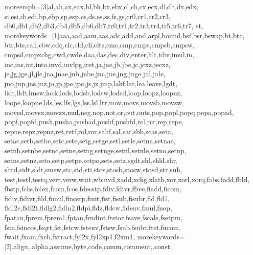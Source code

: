 


%
  {moreemph=[3]{al,ah,ax,eax,bl,bh,bx,ebx,cl,ch,cx,ecx,dl,dh,dx,edx,%
      si,esi,di,edi,bp,ebp,sp,esp,cs,ds,es,ss,fs,gs,cr0,cr1,cr2,cr3,%
      db0,db1,db2,db3,db4,db5,db6,db7,tr0,tr1,tr2,tr3,tr4,tr5,tr6,tr7,%
      st},
   morekeywords=[1]{aaa,aad,aam,aas,adc,add,and,arpl,bound,bsf,bsr,bswap,bt,btc,%
      btr,bts,call,cbw,cdq,clc,cld,cli,clts,cmc,cmp,cmps,cmpsb,cmpsw,%
      cmpsd,cmpxchg,cwd,cwde,daa,das,dec,div,enter,hlt,idiv,imul,in,%
      inc,ins,int,into,invd,invlpg,iret,ja,jae,jb,jbe,jc,jcxz,jecxz,%
      je,jg,jge,jl,jle,jna,jnae,jnb,jnbe,jnc,jne,jng,jnge,jnl,jnle,%
      jno,jnp,jns,jnz,jo,jp,jpe,jpo,js,jz,jmp,lahf,lar,lea,leave,lgdt,%
      lidt,lldt,lmsw,lock,lods,lodsb,lodsw,lodsd,loop,loopz,loopnz,%
      loope,loopne,lds,les,lfs,lgs,lss,lsl,ltr,mov,movs,movsb,movsw,%
      movsd,movsx,movzx,mul,neg,nop,not,or,out,outs,pop,popl,popq,popa,popad,%
      popf,popfd,push,pusha,pushad,pushf,pushfd,rcl,rcr,rep,repe,%
      repne,repz,repnz,ret,retf,rol,ror,sahf,sal,sar,sbb,scas,seta,%
      setae,setb,setbe,setc,sete,setg,setge,setl,setle,setna,setnae,%
      setnb,setnbe,setnc,setne,setng,setnge,setnl,setnle,setno,setnp,%
      setns,setnz,seto,setp,setpe,setpo,sets,setz,sgdt,shl,shld,shr,%
      shrd,sidt,sldt,smsw,stc,std,sti,stos,stosb,stosw,stosd,str,sub,%
      test,testl,testq,verr,verw,wait,wbinvd,xadd,xchg,xlatb,xor,xorl,xorq,fabs,fadd,fbld,%
      fbstp,fchs,fclex,fcom,fcos,fdecstp,fdiv,fdivr,ffree,fiadd,ficom,%
      fidiv,fidivr,fild,fimul,fincstp,finit,fist,fisub,fisubr,fld,fld1,%
      fldl2e,fldl2t,fldlg2,fldln2,fldpi,fldz,fldcw,fldenv,fmul,fnop,%
      fpatan,fprem,fprem1,fptan,frndint,frstor,fsave,fscale,fsetpm,%
      fsin,fsincos,fsqrt,fst,fstcw,fstenv,fstsw,fsub,fsubr,ftst,fucom,%
      fwait,fxam,fxch,fxtract,fyl2x,fyl2xp1,f2xm1},%
   morekeywords=[2]{.align,.alpha,assume,byte,code,comm,comment,.const,%
}}
